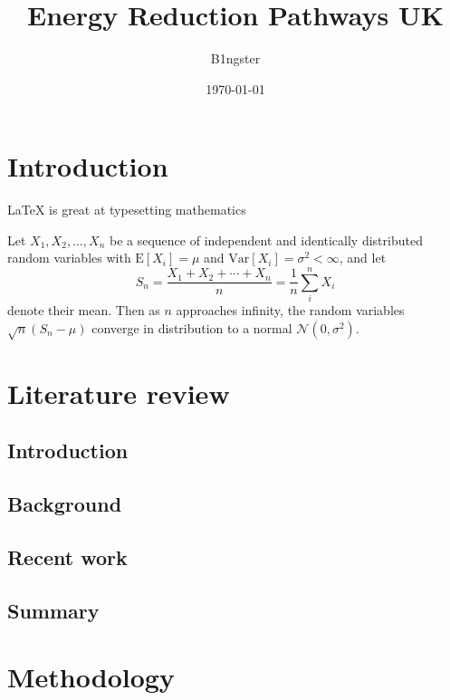\documentclass{article}
\title{Energy Reduction Pathways UK }
\author{B1ngster}
\date{\today}
\begin{document}
\maketitle
\newpage

\begin{abstract}

\end{abstract}


\newpage
\tableofcontents
\newpage


 \section{Introduction}

\LaTeX{} is great at typesetting mathematics \cite{knuthwebsite}



\cite{einstein}  Let $X_1, X_2, \ldots, X_n$ be a sequence of independent and identically distributed random variables with $\text{E}[X_i] = \mu$ and $\text{Var}[X_i] = \sigma^2 < \infty$, and let
$$S_n = \frac{X_1 + X_2 + \cdots + X_n}{n}
      = \frac{1}{n}\sum_{i}^{n} X_i$$
denote their mean. Then as $n$ approaches infinity, the random variables $\sqrt{n}(S_n - \mu)$ converge in distribution to a normal $\mathcal{N}(0, \sigma^2)$.
\newpage

\section{Literature review} %
    \subsection{Introduction}
	
	
	\subsection{Background}

	\subsection{Recent work}
	\subsection{Summary}


\section{Methodology} 
\end{document}
